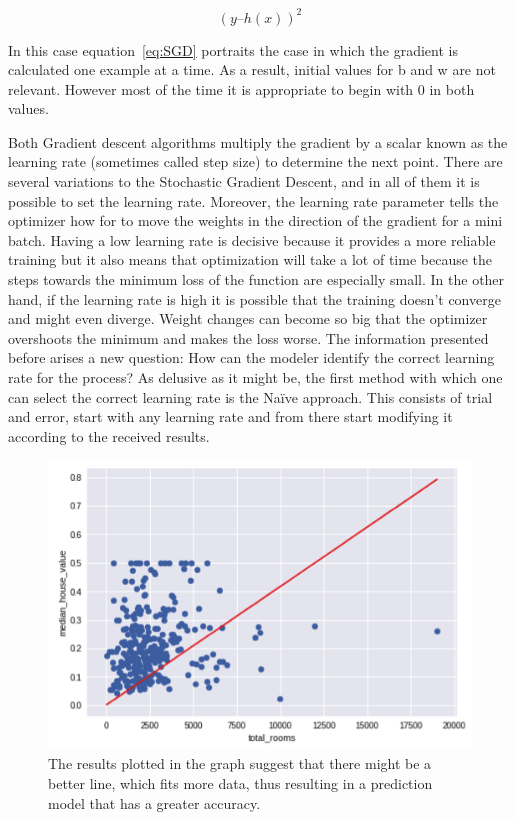 \begin{equation} \label{eq:SGD}
(y – h(x))^2
\end{equation}


In this case equation~\ref{eq:SGD} portraits the case in which the gradient is calculated one example at a time. As a result, initial values for b and w are not relevant. However most of the time it is appropriate to begin with 0 in both values.

Both Gradient descent algorithms multiply the gradient by a scalar known as the learning rate (sometimes called step size) to determine the next point.  There are several variations to the Stochastic Gradient Descent, and in all of them it is possible to set the learning rate.  Moreover, the learning rate parameter tells the optimizer how for to move the weights in the direction of the gradient for a mini batch. Having a low learning rate is decisive because it provides a more reliable training but it also means that optimization will take a lot of time because the steps towards the minimum loss of the function are especially small. In the other hand, if the learning rate is high it is possible that the training doesn’t converge and might even diverge.  Weight changes can become so big that the optimizer overshoots the minimum and makes the loss worse. The information presented before arises a new question: How can the modeler identify the correct learning rate for the process? 
As delusive as it might be, the first method with which one can select the correct learning rate is the Naïve approach. This consists of trial and error, start with any learning rate and from there start modifying it according to the received results. 

\begin{figure}[htbp]
  \centering
  \includegraphics[width=\textwidth]{images/linearGraph}
  \caption{ The results plotted in the graph suggest that there might be a better line, which fits more data, thus resulting in a prediction model that has a greater accuracy.}
  \label{fig:linearGraph}
\end{figure}



